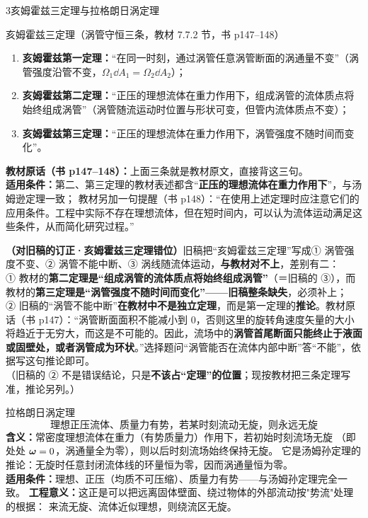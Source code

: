 \begin{kaodian}{3}{亥姆霍兹三定理与拉格朗日涡定理}
\begin{gongshi}{亥姆霍兹三定理（涡管守恒三条，教材 7.7.2 节，书 p147--148）}
\begin{enumerate}
  \item \textbf{亥姆霍兹第一定理：}“在同一时刻，通过涡管任意涡管断面的涡通量不变”（涡管强度沿管不变，$\Omega_1\dd A_1=\Omega_2\dd A_2$）；
  \item \textbf{亥姆霍兹第二定理：}“正压的理想流体在重力作用下，组成涡管的流体质点将始终组成涡管”（涡管随流运动时位置与形状可变，但管内流体质点不变）；
  \item \textbf{亥姆霍兹第三定理：}“正压的理想流体在重力作用下，涡管强度不随时间而变化”。
\end{enumerate}
\textbf{教材原话（书 p147--148）：}上面三条就是教材原文，直接背这三句。\\
\textbf{适用条件：}第二、第三定理的教材表述都含“\textbf{正压的理想流体在重力作用下}”，与汤姆逊定理一致；
教材另加一句提醒（书 p148）：“在使用上述定理时应注意它们的应用条件。工程中实际不存在理想流体，但在短时间内，可以认为流体运动满足这些条件，从而简化研究过程。”
\end{gongshi}

\begin{tishi}
\textbf{（对旧稿的订正·亥姆霍兹三定理错位）}旧稿把“亥姆霍兹三定理”写成① 涡管强度不变、② 涡管不能中断、③ 涡线随流体运动，\textbf{与教材对不上}，差别有二：\\
① 教材的\textbf{第二定理是“组成涡管的流体质点将始终组成涡管”}（＝旧稿的 ③），而教材的\textbf{第三定理是“涡管强度不随时间而变化”——旧稿整条缺失}，必须补上；\\
② 旧稿的“涡管不能中断”\textbf{在教材中不是独立定理}，而是第一定理的\textbf{推论}。教材原话（书 p147）：“涡管断面面积不能减小到 $0$，否则这里的旋转角速度矢量的大小将趋近于无穷大，而这是不可能的。因此，流场中的\textbf{涡管首尾断面只能终止于液面或固壁处，或者涡管成为环状}。”选择题问“涡管能否在流体内部中断”答“不能”，依据写这句推论即可。\\
（旧稿的 ② 不是错误结论，只是\textbf{不该占“定理”的位置}；现按教材把三条定理写准，推论另列。）
\end{tishi}

\begin{gongshi}{拉格朗日涡定理}
\[ \text{理想正压流体、质量力有势，若某时刻流动无旋，则永远无旋} \]
\textbf{含义：}常密度理想流体在重力（有势质量力）作用下，若初始时刻流场无旋
（即处处 $\bm{\omega}=0$，涡通量全为零），则以后时刻流场始终保持无旋。
它是汤姆孙定理的推论：无旋时任意封闭流体线的环量恒为零，因而涡通量恒为零。\\
\textbf{适用条件：}理想、正压（均质不可压缩）、质量力有势——与汤姆孙定理完全一致。
\textbf{工程意义：}这正是可以把远离固体壁面、绕过物体的外部流动按"势流"处理的根据：
来流无旋、流体近似理想，则绕流区无旋。
\end{gongshi}


\end{kaodian}
